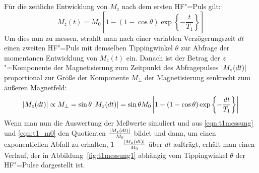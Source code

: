 Für die zeitliche Entwicklung von $M_z$ nach dem ersten HF"=Puls gilt:
	\begin{equation}
		M_z(t) = M_0 \left[1-\left(1-\cos\theta\right)\exp\left\{-\frac{t}{T_1}\right\}\right]
	\end{equation}
Um dies nun zu messen, strahlt man nach einer variablen Verzögerungszeit $dt$ einen zweiten
HF"=Puls mit demselben Tippingwinkel $\theta$ zur Abfrage der momentanen Entwicklung von $M_z(t)$
ein. Danach ist der Betrag der $z$"=Komponente der Magnetisierung zum Zeitpunkt des Abfragepulses
$\abs{M_z(dt)}$ proportional zur Größe der Komponente $M_\perp$ der Magnetisierung senkrecht zum
äußeren Magnetfeld:
	\begin{equation}
		\label{eqn:t1messung}
		\abs{M_z(dt)}\propto M_\perp=\sin\theta \abs{M_z(dt)}=\sin\theta M_0
			\abs{1-\left(1-\cos\theta\right)\exp\left\{-\frac{dt}{T_1}\right\}}
	\end{equation}
Wenn man nun die Auswertung der Meßwerte simuliert und aus \eqref{eqn:t1messung} und
\eqref{eqn:t1_m0} den Quotienten $\frac{\abs{M_z(dt)}}{M_0}$ bildet und dann, um einen
exponentiellen Abfall zu erhalten, $1-\frac{\abs{M_z(dt)}}{M_0}$ über $dt$ aufträgt, erhält man
einen Verlauf, der in Abbildung~\ref{fig:t1messung1} abhängig vom Tippingwinkel $\theta$ der
HF"=Pulse dargestellt ist.
